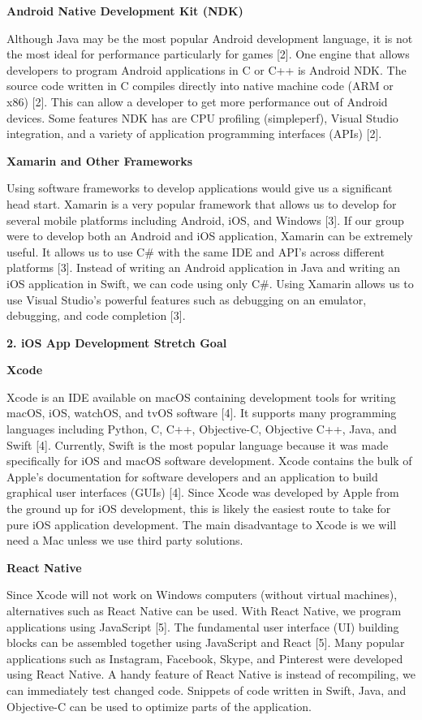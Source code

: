 \documentclass[letterpaper,10pt,draftclsnofoot,onecolumn,]{IEEEtran}
\begin{document}
\textbf{Android Native Development Kit (NDK)}
\par Although Java may be the most popular Android development language, it is not the most ideal for performance particularly for games [2]. One engine that allows developers to program Android applications in C or C++ is Android NDK. The source code written in C compiles directly into native machine code (ARM or x86) [2]. This can allow a developer to get more performance out of Android devices. Some features NDK has are CPU profiling (simpleperf), Visual Studio integration, and a variety of application programming interfaces (APIs) [2].

\textbf{Xamarin and Other Frameworks}
\par Using software frameworks to develop applications would give us a significant head start. Xamarin is a very popular framework that allows us to develop for several mobile platforms including Android, iOS, and Windows [3]. If our group were to develop both an Android and iOS application, Xamarin can be extremely useful. It allows us to use C# with the same IDE and API's across different platforms [3]. Instead of writing an Android application in Java and writing an iOS application in Swift, we can code using only C#. Using Xamarin allows us to use Visual Studio's powerful features such as debugging on an emulator, debugging, and code completion [3].

\begin{center}
\textbf{2. iOS App Development Stretch Goal}\\
\end{center}
\textbf{Xcode}
\par Xcode is an IDE available on macOS containing development tools for writing macOS, iOS, watchOS, and tvOS software [4]. It supports many programming languages including Python, C, C++, Objective-C, Objective C++, Java, and Swift [4]. Currently, Swift is the most popular language because it was made specifically for iOS and macOS software development. Xcode contains the bulk of Apple's documentation for software developers and an application to build graphical user interfaces (GUIs) [4]. Since Xcode was developed by Apple from the ground up for iOS development, this is likely the easiest route to take for pure iOS application development. The main disadvantage to Xcode is we will need a Mac unless we use third party solutions.

\textbf{React Native}
\par Since Xcode will not work on Windows computers (without virtual machines), alternatives such as React Native can be used. With React Native, we program applications using JavaScript [5]. The fundamental user interface (UI) building blocks can be assembled together using JavaScript and React [5]. Many popular applications such as Instagram, Facebook, Skype, and Pinterest were developed using React Native. A handy feature of React Native is instead of recompiling, we can immediately test changed code. Snippets of code written in Swift, Java, and Objective-C can be used to optimize parts of the application.
\end{document}
